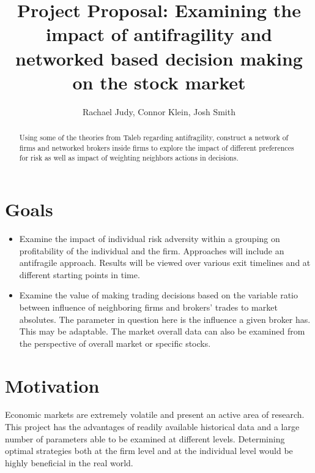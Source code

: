 \documentclass[letterpaper, 10 pt, proceedings]{ieeetran}  %
\title{\LARGE \bf
	Project Proposal: Examining the impact of antifragility and networked based decision making on the stock market
}
\author{Rachael Judy, Connor Klein, Josh Smith%
}
\begin{document}
\maketitle
\thispagestyle{empty}
\pagestyle{empty}

\begin{abstract}
Using some of the theories from Taleb regarding antifragility, construct a network of firms and networked brokers inside firms to explore the impact of different preferences for risk as well as impact of weighting neighbors actions in decisions. 
\end{abstract}

\section{Goals}
\begin{itemize}
	\item Examine the impact of individual risk adversity within a grouping on profitability of the individual and the firm. Approaches will include an antifragile approach. Results will be viewed over various exit timelines and at different starting points in time.
	\item Examine the value of making trading decisions based on the variable ratio between influence of neighboring firms and brokers' trades to market absolutes. The parameter in question here is the influence a given broker has. This may be adaptable. The market overall data can also be examined from the perspective of overall market or specific stocks.
\end{itemize}

\section{Motivation}
Economic markets are extremely volatile and present an active area of research. This project has the advantages of readily available historical data and a large number of parameters able to be examined at different levels. Determining optimal strategies both at the firm level and at the individual level would be highly beneficial in the real world.
\end{document}
